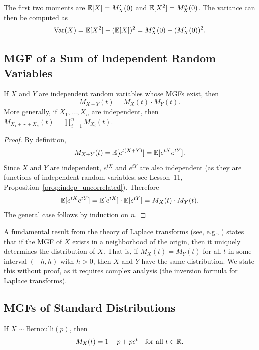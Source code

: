 \documentclass[11pt,a4paper]{article}
\begin{document}
\begin{example}
\label{ex:moments_via_mgf}
The first two moments are $\mathbb{E}[X] = M_X'(0)$ and
$\mathbb{E}[X^2] = M_X''(0)$. The variance can then be computed as
\[
    \operatorname{Var}(X) = \mathbb{E}[X^2] - (\mathbb{E}[X])^2 = M_X''(0) - (M_X'(0))^2.
\]
\end{example}

\subsection{MGF of a Sum of Independent Random Variables}

\begin{theorem}
\label{thm:mgf_sum}
If $X$ and $Y$ are independent random variables whose MGFs exist,
then
\[
    M_{X+Y}(t) = M_X(t) \cdot M_Y(t).
\]
More generally, if $X_1, \ldots, X_n$ are independent, then
$M_{X_1 + \cdots + X_n}(t) = \prod_{i=1}^n M_{X_i}(t)$.
\end{theorem}

\begin{proof}
By definition,
\[
    M_{X+Y}(t) = \mathbb{E}[e^{t(X+Y)}] = \mathbb{E}[e^{tX} e^{tY}].
\]
Since $X$ and $Y$ are independent, $e^{tX}$ and $e^{tY}$ are also
independent (as they are functions of independent random variables;
see Lesson~11, Proposition~\ref*{prop:indep_uncorrelated}). Therefore
\[
    \mathbb{E}[e^{tX} e^{tY}] = \mathbb{E}[e^{tX}] \cdot \mathbb{E}[e^{tY}]
    = M_X(t) \cdot M_Y(t).
\]
The general case follows by induction on $n$.
\end{proof}

\begin{remark}
\label{rem:mgf_uniqueness}
A fundamental result from the theory of Laplace transforms (see,
e.g., \citet[Theorem 2.3.6]{grimmett2020}) states that if the MGF
of $X$ exists in a neighborhood of the origin, then it uniquely
determines the distribution of $X$. That is, if $M_X(t) = M_Y(t)$
for all $t$ in some interval $(-h, h)$ with $h > 0$, then $X$ and
$Y$ have the same distribution. We state this without proof, as it
requires complex analysis (the inversion formula for Laplace
transforms).
\end{remark}

\subsection{MGFs of Standard Distributions}

\begin{proposition}
\label{prop:mgf_bernoulli}
If $X \sim \mathrm{Bernoulli}(p)$, then
\[
    M_X(t) = 1 - p + pe^t \quad \text{for all } t \in \mathbb{R}.
\]
\end{proposition}
\end{document}
